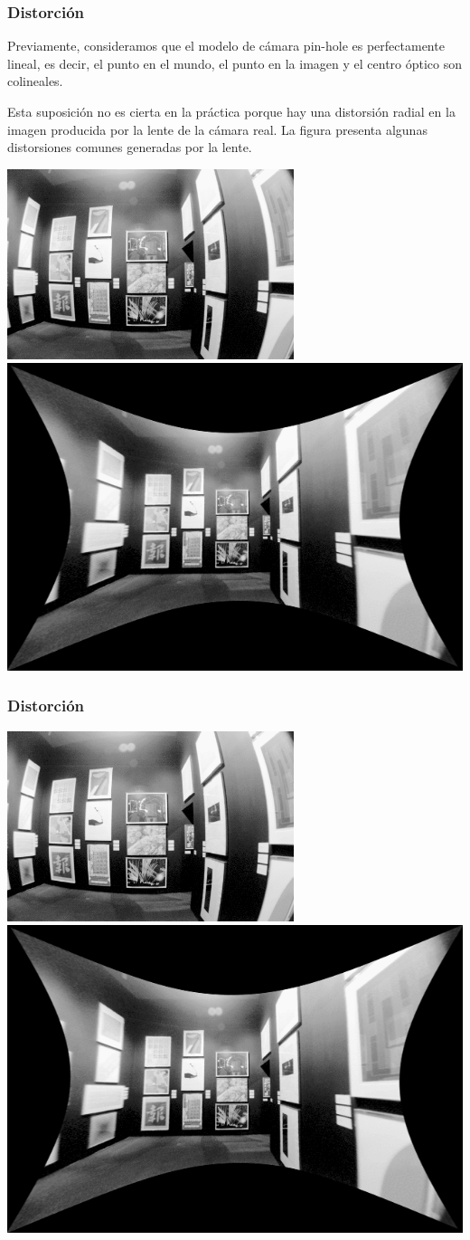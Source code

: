 \begin{frame}
	\frametitle{Distorción}
    
    Previamente, consideramos que el modelo de cámara pin-hole es perfectamente lineal, es decir, el punto en el mundo, el punto en la imagen y el centro óptico son colineales.
	
    Esta suposición no es cierta en la práctica porque hay una distorsión radial en la imagen producida por la lente de la cámara real. La figura presenta algunas distorsiones comunes generadas por la lente.
    
    
    
   	\includegraphics[width=0.4\columnwidth]{images/camera/distorted_image.png}
    \includegraphics[width=0.4\columnwidth]{images/camera/undistorted_image.png}
	
\end{frame}


\begin{frame}
    \frametitle{Distorción}
    
    \includegraphics[width=0.4\columnwidth]{images/camera/distorted_image.png}
    \includegraphics[width=0.4\columnwidth]{images/camera/undistorted_image.png}
    
\end{frame}


